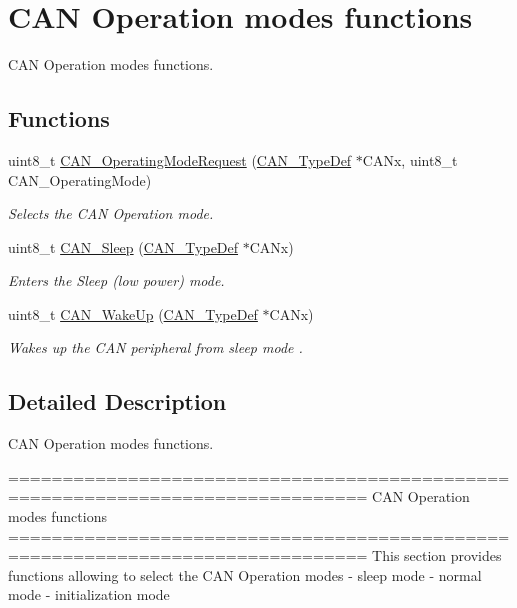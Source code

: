 \hypertarget{group___c_a_n___group4}{}\section{C\+A\+N Operation modes functions}
\label{group___c_a_n___group4}


C\+A\+N Operation modes functions.  


\subsection*{Functions}
\begin{DoxyCompactItemize}
\item 
uint8\+\_\+t \hyperlink{group___c_a_n___group4_gab2a3630e9e3024114eb117d14e514208}{C\+A\+N\+\_\+\+Operating\+Mode\+Request} (\hyperlink{struct_c_a_n___type_def}{C\+A\+N\+\_\+\+Type\+Def} $\ast$C\+A\+Nx, uint8\+\_\+t C\+A\+N\+\_\+\+Operating\+Mode)
\begin{DoxyCompactList}\small\item\em Selects the C\+A\+N Operation mode. \end{DoxyCompactList}\item 
uint8\+\_\+t \hyperlink{group___c_a_n___group4_ga640215e38765759d7eceb8a039046667}{C\+A\+N\+\_\+\+Sleep} (\hyperlink{struct_c_a_n___type_def}{C\+A\+N\+\_\+\+Type\+Def} $\ast$C\+A\+Nx)
\begin{DoxyCompactList}\small\item\em Enters the Sleep (low power) mode. \end{DoxyCompactList}\item 
uint8\+\_\+t \hyperlink{group___c_a_n___group4_ga78cdfbf1884b9e33c552bcbca15bed10}{C\+A\+N\+\_\+\+Wake\+Up} (\hyperlink{struct_c_a_n___type_def}{C\+A\+N\+\_\+\+Type\+Def} $\ast$C\+A\+Nx)
\begin{DoxyCompactList}\small\item\em Wakes up the C\+A\+N peripheral from sleep mode . \end{DoxyCompactList}\end{DoxyCompactItemize}


\subsection{Detailed Description}
C\+A\+N Operation modes functions. 

\begin{DoxyVerb} ===============================================================================
                      CAN Operation modes functions
 ===============================================================================  
  This section provides functions allowing to select the CAN Operation modes
  - sleep mode
  - normal mode 
  - initialization mode\end{DoxyVerb}
 


